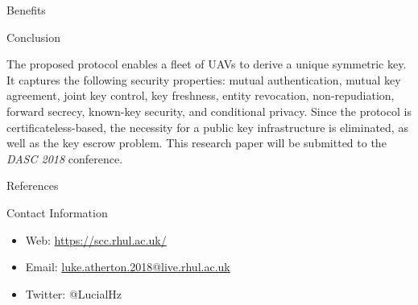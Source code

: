 \documentclass[final]{beamer}
\newlength{\onecolwid}
\begin{document}
\begin{frame}[t]
\begin{columns}[t]
\begin{column}{\onecolwid}
\begin{alertblock}{Benefits}
\end{alertblock}

\vspace*{1cm}
\begin{block}{Conclusion}

The proposed protocol enables a fleet of UAVs to derive a unique symmetric key. It captures the following security properties: mutual authentication, mutual key agreement, joint key control, key freshness, entity revocation, non-repudiation, forward secrecy, known-key security, and conditional privacy. Since the protocol is certificateless-based, the necessity for a public key infrastructure is eliminated, as well as the key escrow problem. This research paper will be submitted to the {\em DASC 2018} conference.

\end{block}

\vspace*{1cm}
\begin{block}{References}

\nocite{*} %
\small{
}

\end{block}



\begin{alertblock}{Contact Information}

\begin{itemize}
\item Web: \href{https://scc.rhul.ac.uk/}{https://scc.rhul.ac.uk/}
\item Email: \href{luke.atherton.2018@live.rhul.ac.uk}{luke.atherton.2018@live.rhul.ac.uk}
\item Twitter: @LucialHz
\end{itemize}


\end{alertblock}
\end{column}
\end{columns}
\end{frame}
\end{document}
